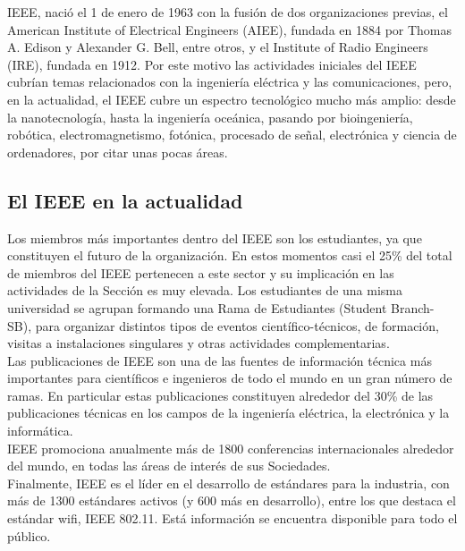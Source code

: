 \documentclass[12pt,letterpaper, onecolumn]{article}
\begin{document}
\begin{multicols}{2}
IEEE, nació el 1 de enero de 1963 con la fusión de dos organizaciones previas, el American Institute of Electrical Engineers (AIEE), fundada en 1884 por Thomas A. Edison y Alexander G. Bell, entre otros, y el Institute of Radio Engineers (IRE), fundada en 1912. Por este motivo las actividades iniciales del IEEE cubrían temas relacionados con la ingeniería eléctrica y las comunicaciones, pero, en la actualidad, el IEEE cubre un espectro tecnológico mucho más amplio: desde la nanotecnología, hasta la ingeniería oceánica, pasando por bioingeniería, robótica, electromagnetismo, fotónica, procesado de señal, electrónica y ciencia de ordenadores, por citar unas pocas áreas.\\

\subsection{El IEEE en la actualidad}

Los miembros más importantes dentro del IEEE son los estudiantes, ya que constituyen el futuro de la organización. En estos momentos casi el 25\% del total de miembros del IEEE pertenecen a este sector y su implicación en las actividades de la Sección es muy elevada. Los estudiantes de una misma universidad se agrupan formando una Rama de Estudiantes (Student Branch-SB), para organizar distintos tipos de eventos científico-técnicos, de formación, visitas a instalaciones singulares y otras actividades complementarias.\\

Las publicaciones de IEEE son una de las fuentes de información técnica más importantes para científicos e ingenieros de todo el mundo en un gran número de ramas. En particular estas publicaciones constituyen alrededor del 30\% de las publicaciones técnicas en los campos de la ingeniería eléctrica, la electrónica y la informática.\\

IEEE promociona anualmente más de 1800 conferencias internacionales alrededor del mundo, en todas las áreas de interés de sus Sociedades.\\

Finalmente, IEEE es el líder en el desarrollo de estándares para la industria, con más de 1300 estándares activos (y 600 más en desarrollo), entre los que destaca el estándar wifi, IEEE 802.11. Está información se encuentra disponible para todo el público\cite{biblio_4}.\\


\begin{thebibliography}{99}


\end{thebibliography}
\end{multicols}
\end{document}
